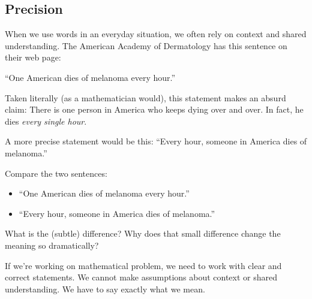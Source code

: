 \subsection{Precision}
When we use words in an everyday situation, we often rely on context and shared understanding.
The American Academy of Dermatology has this sentence on their web page: 
\begin{center}
``One American dies of melanoma every hour.''
\end{center}

Taken literally (as a mathematician would), this statement makes an absurd claim:  There is one person in America who keeps dying over and over.  In fact, he dies \emph{every single hour}.

A more precise statement would be this:
``Every hour, someone in America dies of melanoma.''

\begin{thinkpair*}
Compare the two sentences:
\begin{itemize}
\item
``One American dies of melanoma every hour.''
\item
``Every hour, someone in America dies of melanoma.''
\end{itemize}
What is the (subtle) difference?  Why does that small difference change the meaning so dramatically?

\end{thinkpair*}

 If we're working on mathematical problem, we need to work with clear and correct statements.  We cannot make assumptions about context or shared understanding.  We have to say exactly what we mean.

